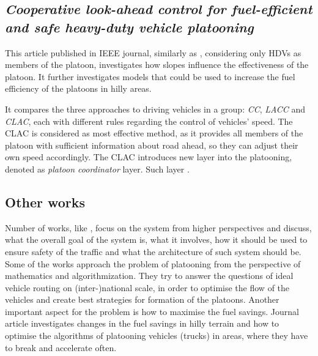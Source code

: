 \subsection{\textit{Cooperative look-ahead control for fuel-efficient and safe heavy-duty vehicle platooning}}
% 
This article \cite{Turri2016CooperativePlatooning} published in \acrshort{IEEE} journal, similarly as \cite{Alam2014Fuel-efficientPlatooning}, considering only \acrshort{HDV}s as members of the platoon, investigates how slopes influence the effectiveness of the platoon. It further investigates models that could be used to increase the fuel efficiency of the platoons in hilly areas.
\par
% 
It compares the three approaches to driving vehicles in a group: \emph{\acrfull{CC}}, \emph{\acrfull{LACC}} and \emph{\acrfull{CLAC}}, each with different rules regarding the control of vehicles' speed. The \acrshort{CLAC} is considered as most effective method, as it provides all members of the platoon with sufficient information about road ahead, so they can adjust their own speed accordingly. The \acrshort{CLAC} introduces new layer into the platooning, denoted as \emph{platoon coordinator} layer. Such layer .
\par
% 
% 
% 
\subsection{Other works}
% 
Number of works, like \cite{Alvarez1997SafeSystems}, \cite{Nowakowski2015CooperativeAlternatives} focus on the system from higher perspectives and discuss, what the overall goal of the system is, what it involves, how it should be used to ensure safety of the traffic and what the architecture of such system should be. Some of the works \cite{Larsson2015TheHeuristics}
approach the problem of platooning from the perspective of mathematics and algorithmization. They try to answer the questions of ideal vehicle routing on (inter-)national scale, in order to optimise the flow of the vehicles and create best strategies for formation of the platoons.
Another important aspect for the problem is how to maximise the fuel savings. Journal article \cite{Turri2016CooperativePlatooning} investigates changes in the fuel savings in hilly terrain and how to optimise the algorithms of platooning vehicles (trucks) in areas, where they have to break and accelerate often.\par
% 
